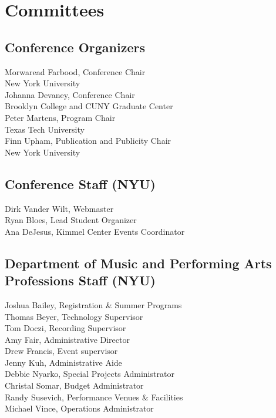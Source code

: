 
\section*{Committees}

\begin{multicols}{2}
\subsection*{Conference Organizers}
Morwaread Farbood, Conference Chair\\
\vspace{.5em}New York University\\
Johanna Devaney, Conference Chair\\
\vspace{.5em}Brooklyn College and CUNY Graduate Center\\
Peter Martens, Program Chair\\
\vspace{.5em}Texas Tech University\\
Finn Upham, Publication and Publicity Chair\\
\vspace{.5em}New York University

\subsection*{Conference Staff (NYU)}
Dirk Vander Wilt, Webmaster \\
Ryan Bloes, Lead Student Organizer\\
Ana DeJesus, Kimmel Center Events Coordinator

\subsection*{Department of Music and Performing Arts Professions Staff (NYU)}
Joshua Bailey, Registration \& Summer Programs\\
Thomas Beyer, Technology Supervisor\\
Tom Doczi, Recording Supervisor\\
Amy Fair, Administrative Director\\
Drew Francis, Event supervisor\\
Jenny Kuh, Administrative Aide\\
Debbie Nyarko, Special Projects Administrator\\
Christal Somar, Budget Administrator\\
Randy Susevich, Performance Venues \& Facilities\\
Michael Vince, Operations Administrator


\end{multicols}
